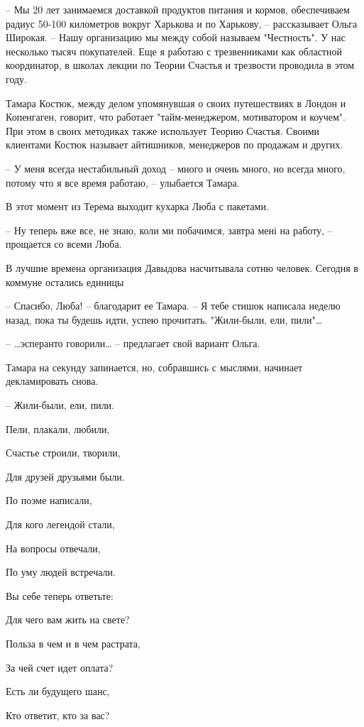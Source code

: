 – Мы 20 лет занимаемся доставкой продуктов питания и кормов, обеспечиваем
радиус 50-100 километров вокруг Харькова и по Харькову, – рассказывает Ольга
Широкая. – Нашу организацию мы между собой называем "Честность". У нас
несколько тысяч покупателей. Еще я работаю с трезвенниками как областной
координатор, в школах лекции по Теории Счастья и трезвости проводила в этом
году.

Тамара Костюк, между делом упомянувшая о своих путешествиях в Лондон и
Копенгаген, говорит, что работает "тайм-менеджером, мотиватором и коучем". При
этом в своих методиках также использует Теорию Счастья. Своими клиентами Костюк
называет айтишников, менеджеров по продажам и других.

– У меня всегда нестабильный доход – много и очень много, но всегда много,
потому что я все время работаю, – улыбается Тамара.

В этот момент из Терема выходит кухарка Люба с пакетами.

– Ну теперь вже все, не знаю, коли ми побачимся, завтра мені на работу, –
прощается со всеми Люба.



В лучшие времена организация Давыдова насчитывала сотню человек. Сегодня в коммуне остались единицы

– Спасибо, Люба! – благодарит ее Тамара. – Я тебе стишок написала неделю назад, пока ты будешь идти, успею прочитать. "Жили-были, ели, пили"…

– …эсперанто говорили… – предлагает свой вариант Ольга.

Тамара на секунду запинается, но, собравшись с мыслями, начинает декламировать снова.

– Жили-были, ели, пили.

Пели, плакали, любили,

Счастье строили, творили,

Для друзей друзьями были.

По поэме написали,

Для кого легендой стали,

На вопросы отвечали,

По уму людей встречали.

Вы себе теперь ответьте:

Для чего вам жить на свете?

Польза в чем и в чем растрата,

За чей счет идет оплата?

Есть ли будущего шанс,

Кто ответит, кто за вас?

